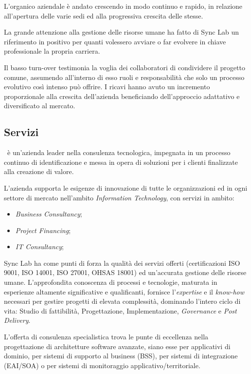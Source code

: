 L'organico aziendale è andato crescendo in modo continuo e rapido, in relazione
all'apertura delle varie sedi ed alla progressiva crescita delle stesse.

La grande attenzione alla gestione delle risorse umane ha fatto di Sync Lab un
riferimento in positivo per quanti volessero avviare o far evolvere in chiave professionale la propria carriera.

Il basso turn-over testimonia la voglia dei collaboratori di condividere il progetto comune, assumendo all'interno di esso ruoli e responsabilità che solo un processo
evolutivo così intenso può offrire.
I ricavi hanno avuto un incremento proporzionale alla crescita dell'azienda beneficiando dell'approccio adattativo e diversificato al mercato.

\subsection{Servizi}

\myCompany\ è un'azienda leader nella consulenza tecnologica, impegnata in un
processo continuo di identificazione e messa in opera di soluzioni per i clienti finalizzate
alla creazione di valore.

L'azienda supporta le esigenze di innovazione di tutte le
organizzazioni ed in ogni settore di mercato nell'ambito \textit{Information Technology}, con
servizi in ambito:
\begin{itemize}
	\item \textit{Business Consultancy};
	\item \textit{Project Financing};
	\item \textit{IT Consultancy};
\end{itemize}

Sync Lab ha come punti di forza la qualità dei servizi offerti (certificazioni ISO 9001,
ISO 14001, ISO 27001, OHSAS 18001) ed un'accurata gestione delle risorse umane.
L'approfondita conoscenza di processi e tecnologie, maturata in esperienze altamente
significative e qualificanti, fornisce l'\textit{expertise} e il \textit{know-how} necessari per gestire
progetti di elevata complessità, dominando l'intero ciclo di vita: Studio di fattibilità,
Progettazione, Implementazione, \textit{Governance} e \textit{Post Delivery}.

L'offerta di consulenza specialistica trova le punte di eccellenza nella progettazione di
architetture software avanzate, siano esse per applicativi di dominio, per sistemi di
supporto al business (BSS), per sistemi di integrazione (EAI/SOA) o per sistemi di
monitoraggio applicativo/territoriale.

